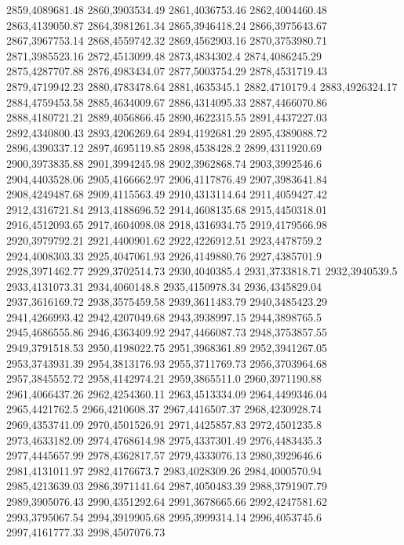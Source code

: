 2859,4089681.48
2860,3903534.49
2861,4036753.46
2862,4004460.48
2863,4139050.87
2864,3981261.34
2865,3946418.24
2866,3975643.67
2867,3967753.14
2868,4559742.32
2869,4562903.16
2870,3753980.71
2871,3985523.16
2872,4513099.48
2873,4834302.4
2874,4086245.29
2875,4287707.88
2876,4983434.07
2877,5003754.29
2878,4531719.43
2879,4719942.23
2880,4783478.64
2881,4635345.1
2882,4710179.4
2883,4926324.17
2884,4759453.58
2885,4634009.67
2886,4314095.33
2887,4466070.86
2888,4180721.21
2889,4056866.45
2890,4622315.55
2891,4437227.03
2892,4340800.43
2893,4206269.64
2894,4192681.29
2895,4389088.72
2896,4390337.12
2897,4695119.85
2898,4538428.2
2899,4311920.69
2900,3973835.88
2901,3994245.98
2902,3962868.74
2903,3992546.6
2904,4403528.06
2905,4166662.97
2906,4117876.49
2907,3983641.84
2908,4249487.68
2909,4115563.49
2910,4313114.64
2911,4059427.42
2912,4316721.84
2913,4188696.52
2914,4608135.68
2915,4450318.01
2916,4512093.65
2917,4604098.08
2918,4316934.75
2919,4179566.98
2920,3979792.21
2921,4400901.62
2922,4226912.51
2923,4478759.2
2924,4008303.33
2925,4047061.93
2926,4149880.76
2927,4385701.9
2928,3971462.77
2929,3702514.73
2930,4040385.4
2931,3733818.71
2932,3940539.5
2933,4131073.31
2934,4060148.8
2935,4150978.34
2936,4345829.04
2937,3616169.72
2938,3575459.58
2939,3611483.79
2940,3485423.29
2941,4266993.42
2942,4207049.68
2943,3938997.15
2944,3898765.5
2945,4686555.86
2946,4363409.92
2947,4466087.73
2948,3753857.55
2949,3791518.53
2950,4198022.75
2951,3968361.89
2952,3941267.05
2953,3743931.39
2954,3813176.93
2955,3711769.73
2956,3703964.68
2957,3845552.72
2958,4142974.21
2959,3865511.0
2960,3971190.88
2961,4066437.26
2962,4254360.11
2963,4513334.09
2964,4499346.04
2965,4421762.5
2966,4210608.37
2967,4416507.37
2968,4230928.74
2969,4353741.09
2970,4501526.91
2971,4425857.83
2972,4501235.8
2973,4633182.09
2974,4768614.98
2975,4337301.49
2976,4483435.3
2977,4445657.99
2978,4362817.57
2979,4333076.13
2980,3929646.6
2981,4131011.97
2982,4176673.7
2983,4028309.26
2984,4000570.94
2985,4213639.03
2986,3971141.64
2987,4050483.39
2988,3791907.79
2989,3905076.43
2990,4351292.64
2991,3678665.66
2992,4247581.62
2993,3795067.54
2994,3919905.68
2995,3999314.14
2996,4053745.6
2997,4161777.33
2998,4507076.73
